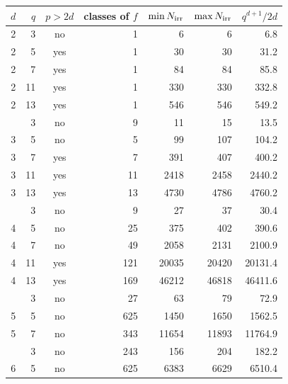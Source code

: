 \begin{tabular}{rrcrrrr}
\toprule
$d$ & $q$ & $p>2d$ & classes of $f$ & $\min N_{\rm irr}$ & $\max N_{\rm irr}$ & $q^{d+1}/2d$ \\
\midrule
2 & 3 & no & 1 & 6 & 6 & 6.8 \\
2 & 5 & yes & 1 & 30 & 30 & 31.2 \\
2 & 7 & yes & 1 & 84 & 84 & 85.8 \\
2 & 11 & yes & 1 & 330 & 330 & 332.8 \\
2 & 13 & yes & 1 & 546 & 546 & 549.2 \\
\addlinespace
3 & 3 & no & 9 & 11 & 15 & 13.5 \\
3 & 5 & no & 5 & 99 & 107 & 104.2 \\
3 & 7 & yes & 7 & 391 & 407 & 400.2 \\
3 & 11 & yes & 11 & 2418 & 2458 & 2440.2 \\
3 & 13 & yes & 13 & 4730 & 4786 & 4760.2 \\
\addlinespace
4 & 3 & no & 9 & 27 & 37 & 30.4 \\
4 & 5 & no & 25 & 375 & 402 & 390.6 \\
4 & 7 & no & 49 & 2058 & 2131 & 2100.9 \\
4 & 11 & yes & 121 & 20035 & 20420 & 20131.4 \\
4 & 13 & yes & 169 & 46212 & 46818 & 46411.6 \\
\addlinespace
5 & 3 & no & 27 & 63 & 79 & 72.9 \\
5 & 5 & no & 625 & 1450 & 1650 & 1562.5 \\
5 & 7 & no & 343 & 11654 & 11893 & 11764.9 \\
\addlinespace
6 & 3 & no & 243 & 156 & 204 & 182.2 \\
6 & 5 & no & 625 & 6383 & 6629 & 6510.4 \\
\bottomrule
\end{tabular}